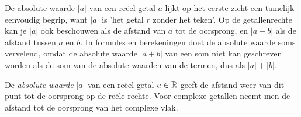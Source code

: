 \documentclass{ximera}
\begin{document}
	\author{Wim Obbels}
	\label{xim:complexe_getallen_norm}


\begin{xmuitweiding}
De absolute waarde $|a|$ van een reëel getal $a$ lijkt op het eerste zicht een tamelijk eenvoudig begrip, want $|a|$ is 'het getal $r$ zonder het teken'.
Op de getallenrechte kan je $|a|$ ook beschouwen als de afstand van $a$ tot de oorsprong, en $|a-b|$ als de afstand tussen $a$ en $b$.
In formules en berekeningen doet de absolute waarde soms vervelend, omdat de absolute waarde $|a+b|$ van een som niet kan geschreven worden als de som van de absolute waarden van de termen, dus als $|a|+|b|$.
\end{xmuitweiding}



De \textit{absolute waarde} $|a|$ van een reëel getal $a\in\mathbb{R}$ geeft de afstand weer van dit punt tot de oorsprong op de reële rechte. Voor complexe getallen neemt men de afstand tot de oorsprong van het complexe vlak.

\end{document}
